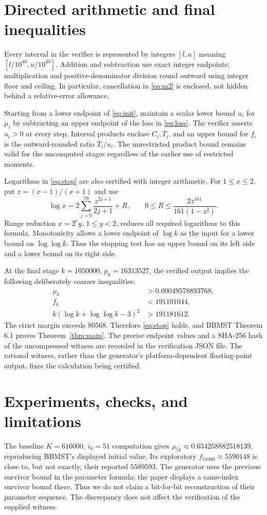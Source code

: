 \documentclass[11pt]{article}
\begin{document}
\section{Directed arithmetic and final inequalities}
Every interval in the verifier is represented by integers $[l,u]$ meaning
$[l/10^{40},u/10^{40}]$. Addition and subtraction use exact integer endpoints;
multiplication and positive-denominator division round outward using integer
floor and ceiling. In particular, cancellation in \eqref{eq:m2} is enclosed,
not hidden behind a relative-error allowance.

Starting from a lower endpoint of \eqref{eq:init}, maintain a scalar lower
bound $u_i$ for $\mu_i$ by subtracting an upper endpoint of the loss in
\eqref{eq:loss}. The verifier asserts $u_i>0$ at every step. Interval products
enclose $C_i,T_i$, and an upper bound for $f_i$ is the outward-rounded ratio
$\overline T_i/u_i$. The unrestricted product bound remains valid for the
uncomputed stages regardless of the earlier use of restricted moments.

Logarithms in \eqref{eq:stop} are also certified with integer arithmetic.
For $1\leq x\leq2$, put $z=(x-1)/(x+1)$ and use
\[
 \log x=2\sum_{j=0}^{79}\frac{z^{2j+1}}{2j+1}+R,
 \qquad 0\leq R\leq\frac{2z^{161}}{161(1-z^2)}.
\]
Range reduction $x=2^e y$, $1\leq y<2$, reduces all required logarithms to
this formula. Monotonicity allows a lower endpoint of $\log k$ as the input
for a lower bound on $\log\log k$. Thus the stopping test has an upper bound
on its left side and a lower bound on its right side.

At the final stage $k=1050000$, $p_k=16313527$, the verified output implies
the following deliberately coarser inequalities:
\begin{align*}
 \mu_k&>0.00049578893768,\\
 f_k&<191101044,\\
 k(\log k+\log\log k-3)^2&>191181612.
\end{align*}
The strict margin exceeds $80568$. Therefore \eqref{eq:stop} holds, and
BBMST Theorem 6.1 proves Theorem~\ref{thm:main}. The precise endpoint values
and a SHA-256 hash of the uncompressed witness are recorded in the verification
JSON file. The rational witness, rather than the generator's platform-dependent
floating-point output, fixes the calculation being certified.

\section{Experiments, checks, and limitations}
The baseline $K=616000$, $i_0=51$ computation gives
$\mu_{51}\approx0.654258882518139$, reproducing BBMST's displayed initial
value. Its exploratory $f_{51000}\approx5590148$ is close to, but not exactly,
their reported $5589593$. The generator uses the previous survivor bound in
the parameter formula; the paper displays a same-index survivor bound there.
Thus we do not claim a bit-for-bit reconstruction of their parameter sequence.
The discrepancy does not affect the verification of the supplied witness.
\end{document}

